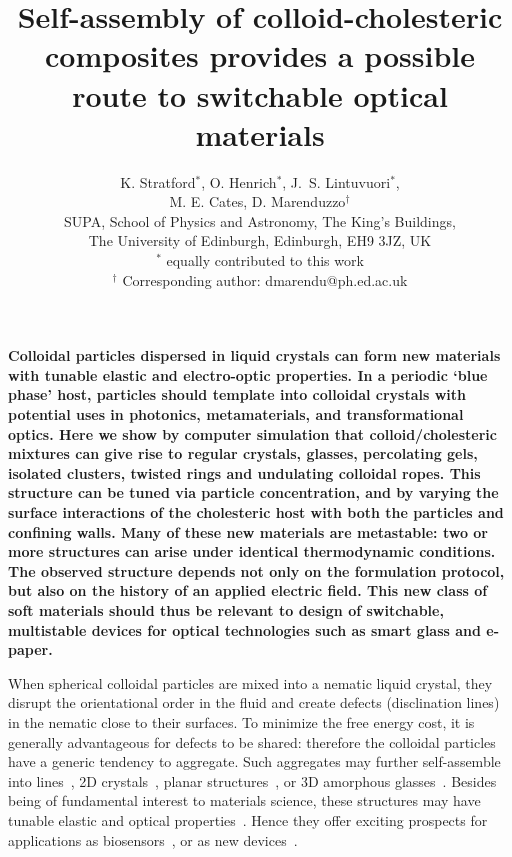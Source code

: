 \documentclass[12pt]{article}
\begin{document}
\title{Self-assembly of colloid-cholesteric composites provides
a possible route to switchable optical materials}

\author{K. Stratford$^{*}$, O. Henrich$^{*}$, J.~S. Lintuvuori$^{*}$,\\
M. E. Cates, D. Marenduzzo$^\dagger$ \\ 
SUPA, School of Physics and Astronomy, The King's Buildings,\\
The University of Edinburgh, Edinburgh, EH9 3JZ, UK\\
\small{$^{*}$ equally contributed to this work}\\
\small{$^\dagger$ Corresponding author: dmarendu@ph.ed.ac.uk}
}
\date{}

\maketitle

\noindent

\noindent
{\bf
Colloidal particles dispersed in liquid crystals can form new materials
with tunable elastic and electro-optic properties. In a periodic `blue
phase' host, particles should template into colloidal crystals with
potential uses in photonics, metamaterials, and transformational optics.
Here we show by computer simulation that colloid/cholesteric mixtures can
give rise to regular crystals, glasses, percolating gels, isolated clusters,
twisted rings and undulating colloidal ropes. This structure can be tuned
via particle concentration, and by varying the surface interactions of the
cholesteric host with both
the particles and confining walls. Many of these new materials are metastable:
two or more structures can arise under identical thermodynamic conditions.
The observed structure depends not only on the formulation protocol, but also
on the history of an applied electric field. This new class of soft materials
should thus be relevant to design of switchable, multistable devices for
optical technologies such as smart glass and e-paper.
}


\bigskip
\noindent

\noindent
When spherical colloidal particles are mixed into a nematic liquid crystal, 
they disrupt the orientational order in the fluid and create defects (disclination lines) in the nematic close to their surfaces. To minimize the free energy cost, it is generally advantageous for defects to be shared:
therefore the colloidal particles have a generic tendency to aggregate. Such aggregates may further 
self-assemble into lines~\cite{wiresmiha}, 2D crystals~\cite{zumer}, 
planar structures~\cite{tanaka}, or 3D amorphous glasses~\cite{tiffany}.
Besides being of fundamental interest to materials science, these
structures may have tunable elastic and optical properties~\cite{stark}. Hence 
they offer exciting prospects for applications as biosensors~\cite{abbott}, or
as new devices~\cite{colloiddevice,tanakanatmat}.
\end{document}
